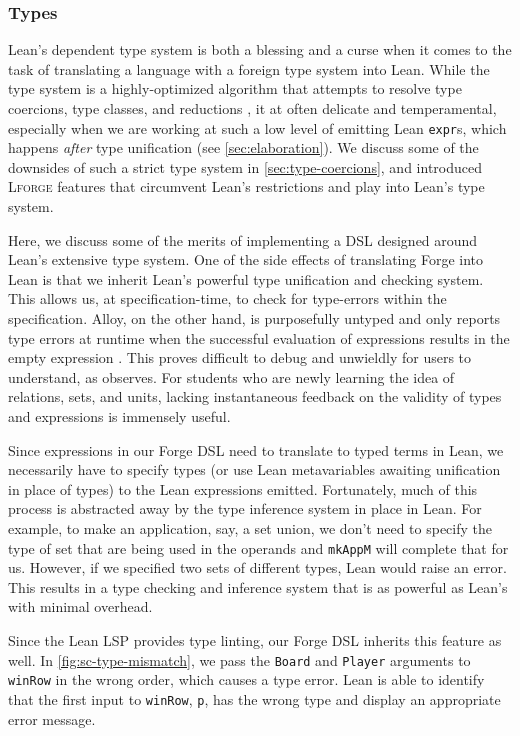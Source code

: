 \subsubsection{Types}

Lean's dependent type system is both a blessing and a curse when it comes to the task of translating a language with a foreign type system into Lean. While the type system is a highly-optimized algorithm that attempts to resolve type coercions, type classes, and reductions \cite{de2015lean}, it at often delicate and temperamental, especially when we are working at such a low level of emitting Lean \texttt{expr}s, which happens \emph{after} type unification (see \cref{sec:elaboration}). We discuss some of the downsides of such a strict type system in \cref{sec:type-coercions}, and introduced \textsc{Lforge} features that circumvent Lean's restrictions and play into Lean's type system. 

Here, we discuss some of the merits of implementing a DSL designed around Lean's extensive type system. One of the side effects of translating Forge into Lean is that we inherit Lean's powerful type unification and checking system. This allows us, at specification-time, to check for type-errors within the specification. Alloy, on the other hand, is purposefully untyped \cite{jackson2019alloy} and only reports type errors at runtime when the successful evaluation of expressions results in the empty expression \cite{edwards2004type}. This proves difficult to debug and unwieldly for users to understand, as \cite{ngpdbccdlrrvwwk-oopsla-2024} observes. For students who are newly learning the idea of relations, sets, and units, lacking instantaneous feedback on the validity of types and expressions is immensely useful. 

Since expressions in our Forge DSL need to translate to typed terms in Lean, we necessarily have to specify types (or use Lean metavariables awaiting unification in place of types) to the Lean expressions emitted. Fortunately, much of this process is abstracted away by the type inference system in place in Lean. For example, to make an application, say, a set union, we don't need to specify the type of set that are being used in the operands and \texttt{mkAppM} will complete that for us. However, if we specified two sets of different types, Lean would raise an error. This results in a type checking and inference system that is as powerful as Lean's with minimal overhead. 

Since the Lean LSP provides type linting, our Forge DSL inherits this feature as well. In \cref{fig:sc-type-mismatch}, we pass the \texttt{Board} and \texttt{Player} arguments to \texttt{winRow} in the wrong order, which causes a type error. Lean is able to identify that the first input to \texttt{winRow}, \texttt{p}, has the wrong type and display an appropriate error message. 

